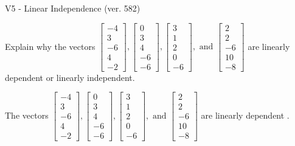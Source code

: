 \begin{exercise}
  \begin{exerciseTitle}V5 - Linear Independence (ver. 582)\end{exerciseTitle}
  \begin{exerciseStatement}
    Explain why the vectors \(\left[\begin{array}{r}
-4 \\
3 \\
-6 \\
4 \\
-2
\end{array}\right] , \left[\begin{array}{r}
0 \\
3 \\
4 \\
-6 \\
-6
\end{array}\right] , \left[\begin{array}{r}
3 \\
1 \\
2 \\
0 \\
-6
\end{array}\right] , \text{ and } \left[\begin{array}{r}
2 \\
2 \\
-6 \\
10 \\
-8
\end{array}\right]\) are linearly dependent or linearly independent.	


  \end{exerciseStatement}
  \begin{exerciseAnswer}
   The vectors \(\left[\begin{array}{r}
-4 \\
3 \\
-6 \\
4 \\
-2
\end{array}\right] , \left[\begin{array}{r}
0 \\
3 \\
4 \\
-6 \\
-6
\end{array}\right] , \left[\begin{array}{r}
3 \\
1 \\
2 \\
0 \\
-6
\end{array}\right] , \text{ and } \left[\begin{array}{r}
2 \\
2 \\
-6 \\
10 \\
-8
\end{array}\right]\) are 
  	 linearly dependent  .
  


  \end{exerciseAnswer}
\end{exercise}